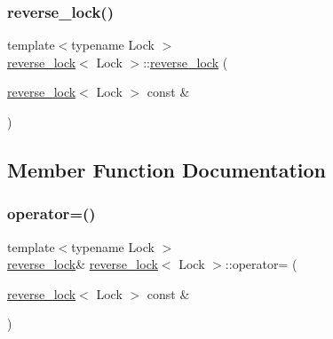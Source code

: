\mbox{\label{classreverse__lock_a28150c909bbb044879563627b3207a43}} 
\subsubsection{\texorpdfstring{reverse\+\_\+lock()}{reverse\_lock()}\hspace{0.1cm}{\footnotesize\ttfamily [2/2]}}
{\footnotesize\ttfamily template$<$typename Lock $>$ \\
\mbox{\hyperlink{classreverse__lock}{reverse\+\_\+lock}}$<$ Lock $>$\+::\mbox{\hyperlink{classreverse__lock}{reverse\+\_\+lock}} (\begin{DoxyParamCaption}\item[{\mbox{\hyperlink{classreverse__lock}{reverse\+\_\+lock}}$<$ Lock $>$ const \&}]{ }\end{DoxyParamCaption})\hspace{0.3cm}{\ttfamily [private]}}



\subsection{Member Function Documentation}
\mbox{\label{classreverse__lock_acde60471a1c26c4bcde36445a813dae4}} 
\subsubsection{\texorpdfstring{operator=()}{operator=()}}
{\footnotesize\ttfamily template$<$typename Lock $>$ \\
\mbox{\hyperlink{classreverse__lock}{reverse\+\_\+lock}}\& \mbox{\hyperlink{classreverse__lock}{reverse\+\_\+lock}}$<$ Lock $>$\+::operator= (\begin{DoxyParamCaption}\item[{\mbox{\hyperlink{classreverse__lock}{reverse\+\_\+lock}}$<$ Lock $>$ const \&}]{ }\end{DoxyParamCaption})\hspace{0.3cm}{\ttfamily [private]}}



